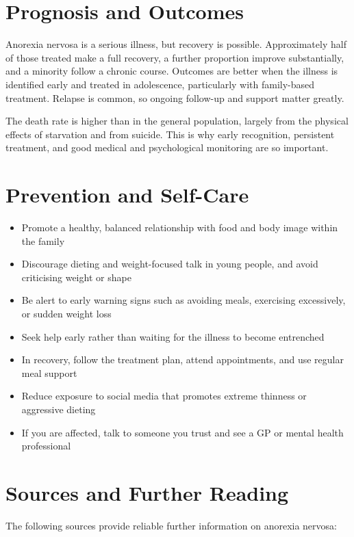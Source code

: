 \section*{Prognosis and Outcomes}
Anorexia nervosa is a serious illness, but recovery is possible. Approximately half of those treated make a full recovery, a further proportion improve substantially, and a minority follow a chronic course. Outcomes are better when the illness is identified early and treated in adolescence, particularly with family-based treatment. Relapse is common, so ongoing follow-up and support matter greatly.

The death rate is higher than in the general population, largely from the physical effects of starvation and from suicide. This is why early recognition, persistent treatment, and good medical and psychological monitoring are so important.

\section*{Prevention and Self-Care}
\begin{itemize}
    \item Promote a healthy, balanced relationship with food and body image within the family
    \item Discourage dieting and weight-focused talk in young people, and avoid criticising weight or shape
    \item Be alert to early warning signs such as avoiding meals, exercising excessively, or sudden weight loss
    \item Seek help early rather than waiting for the illness to become entrenched
    \item In recovery, follow the treatment plan, attend appointments, and use regular meal support
    \item Reduce exposure to social media that promotes extreme thinness or aggressive dieting
    \item If you are affected, talk to someone you trust and see a GP or mental health professional
\end{itemize}

\section*{Sources and Further Reading}
The following sources provide reliable further information on anorexia nervosa:

